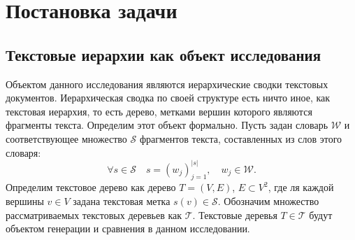 \documentclass[12pt]{article}
\begin{document}
\newpage
\section{Постановка задачи}
\subsection{Текстовые иерархии как объект исследования}
Объектом данного исследования являются иерархические сводки текстовых документов. Иерархическая сводка по своей структуре есть ничто иное, как текстовая иерархия, то есть дерево, метками вершин которого являются фрагменты текста. Определим этот объект формально. Пусть задан словарь $\mathcal{W}$ и соответствующее множество $\mathcal{S}$ фрагментов текста, составленных из слов этого словаря: 
$$
\forall s\in\mathcal{S}\quad s = \left(w_j\right)_{j=1}^{|s|}, \quad w_j\in \mathcal{W}.
$$
Определим текстовое дерево как дерево $T = (V, E)$, $E\subset V^2$, где ля каждой вершины $v\in V$ задана текстовая метка $s(v)\in \mathcal{S}$. Обозначим множество рассматриваемых текстовых деревьев как $\mathcal{T}$. Текстовые деревья $T\in \mathcal{T}$ будут объектом генерации и сравнения в данном исследовании. 
\end{document}
